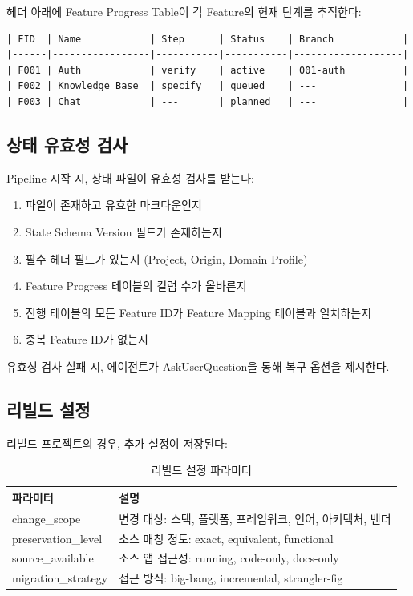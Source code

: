 \documentclass[11pt,a4paper,openright,twoside]{report}
\begin{document}
헤더 아래에 Feature Progress Table이 각 Feature의 현재 단계를 추적한다:

\begin{lstlisting}[title={Feature Progress Table}]
| FID  | Name            | Step      | Status    | Branch            |
|------|-----------------|-----------|-----------|-------------------|
| F001 | Auth            | verify    | active    | 001-auth          |
| F002 | Knowledge Base  | specify   | queued    | ---               |
| F003 | Chat            | ---       | planned   | ---               |
\end{lstlisting}

\subsection{상태 유효성 검사}

Pipeline 시작 시, 상태 파일이 유효성 검사를 받는다:

\begin{enumerate}
  \item 파일이 존재하고 유효한 마크다운인지
  \item State Schema Version 필드가 존재하는지
  \item 필수 헤더 필드가 있는지 (Project, Origin, Domain Profile)
  \item Feature Progress 테이블의 컬럼 수가 올바른지
  \item 진행 테이블의 모든 Feature ID가 Feature Mapping 테이블과 일치하는지
  \item 중복 Feature ID가 없는지
\end{enumerate}

유효성 검사 실패 시, 에이전트가 AskUserQuestion을 통해 복구 옵션을 제시한다.

\subsection{리빌드 설정}

리빌드 프로젝트의 경우, 추가 설정이 저장된다:

\begin{table}[H]
\centering
\caption{리빌드 설정 파라미터}
\label{tab:rebuild-config}
\begin{tabularx}{\textwidth}{lX}
\toprule
\textbf{파라미터} & \textbf{설명} \\
\midrule
change\_scope & 변경 대상: 스택, 플랫폼, 프레임워크, 언어, 아키텍처, 벤더 \\
preservation\_level & 소스 매칭 정도: exact, equivalent, functional \\
source\_available & 소스 앱 접근성: running, code-only, docs-only \\
migration\_strategy & 접근 방식: big-bang, incremental, strangler-fig \\
\bottomrule
\end{tabularx}
\end{table}
\end{document}
